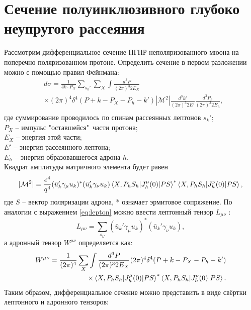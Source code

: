 \documentclass{extreport}
\begin{document}
\section{Сечение полуинклюзивного глубоко неупругого рассеяния}
Рассмотрим дифференциальное сечение ПГНР неполяризованного мюона на поперечно поляризованном протоне. Определить сечение в первом разложении можно с помощью правил Фейнмана:
\begin{equation}
\begin{split}
	& d\sigma = \frac{1}{4k\cdot P_X} \sum_{s_k'} \sum_X \int \frac{d^3 P}{(2\pi)^3 2 E_X} \\
	& \times (2\pi)^4 \delta^4(P+k-P_X - P_h - k')|\mathcal{M}^2| \frac{d^3 k'}{(2\pi)^3 2E'}\frac{d^3 P_h}{(2\pi)^3 2E_h}, \\
\end{split}
\end{equation}
где суммирование проводилось по спинам рассеянных лептонов $s_k'$; \\ $P_X$ -- импульс "оставшейся"\ части протона; \\ $E_X$ -- энергия этой части; \\ $E'$ -- энергия рассеянного лептона; \\ $E_h$ -- энергия образовавшегося адрона $h$. \\ Квадрат амплитуды матричного элемента будет равен
\begin{equation}
		|\mathcal{M}^2| = \frac{e^4}{q^4} (\bar{u}_k'\gamma_\mu u_k)^{*}(\bar{u}_k'\gamma_\nu u_k)  \braket{X, P_h S_h | J_h^\mu (0) | PS}^{*} \braket{X, P_h S_h | J_h^\nu (0) | PS},
\end{equation}
где $S$ -- вектор поляризации адрона, * означает эрмитовое сопряжение. По аналогии с выражением \ref{eq:lepton} можно ввести лептонный тензор $L_{\mu \nu}$ \cite{Barone_2002}:
\begin{equation}
	L_{\mu \nu} = \sum_{s_{k'}} (\bar{u}_k'\gamma_\mu u_k)^{*}(\bar{u}_k'\gamma_\nu u_k),
\end{equation}
а адронный тензор $W^{\mu \nu}$ определяется как:
\begin{equation}
	\begin{split}
		W^{\mu \nu} = \frac{1}{(2\pi)^4} \sum_X \int \frac{d^3 P}{(2\pi)^3 2 E_X} (2\pi)^4 \delta^4(P+k-P_X - P_h - k') \\
		\times \braket{X, P_h S_h | J_h^\mu (0) | PS}^{*} \braket{X, P_h S_h | J_h^\nu (0) | PS}.
	\end{split}
\end{equation}
Таким образом, дифференциальное сечение можно представить в виде свёртки лептонного и адронного тензоров:
\end{document}
